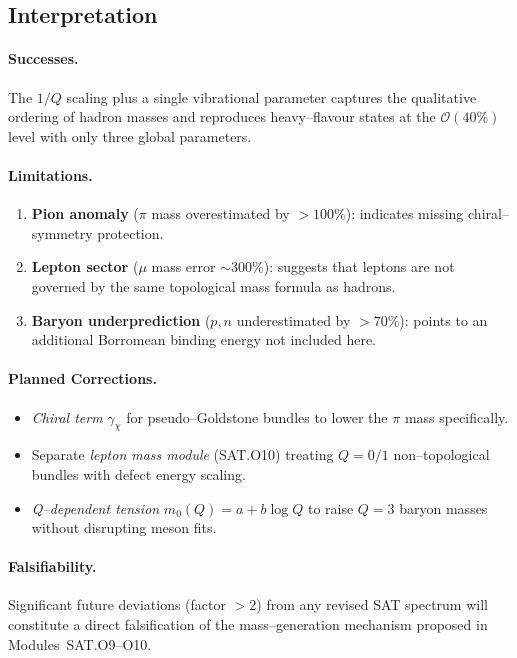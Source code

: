 \subsection{Interpretation}

\paragraph{Successes.}  The $1/Q$ scaling plus a single vibrational parameter
captures the qualitative ordering of hadron masses and reproduces heavy--flavour
states at the $\mathcal{O}(40\%)$ level with only three global parameters.

\paragraph{Limitations.}
\begin{enumerate}
    \item \textbf{Pion anomaly} ($\pi$ mass overestimated by $>100\%$):
          indicates missing chiral--symmetry protection.
    \item \textbf{Lepton sector} ($\mu$ mass error $\sim300\%$):
          suggests that leptons are not governed by the same
          topological mass formula as hadrons.
    \item \textbf{Baryon underprediction} ($p,n$ underestimated by $>70\%$):
          points to an additional Borromean binding energy not included here.
\end{enumerate}

\paragraph{Planned Corrections.}
\begin{itemize}
    \item \emph{Chiral term} $\gamma_\chi$ for pseudo--Goldstone bundles to
          lower the $\pi$ mass specifically.
    \item Separate \emph{lepton mass module} (SAT.O10) treating $Q=0/1$
          non--topological bundles with defect energy scaling.
    \item \emph{Q--dependent tension} $m_0(Q) = a + b\log Q$ to raise
          $Q=3$ baryon masses without disrupting meson fits.
\end{itemize}

\paragraph{Falsifiability.}
Significant future deviations (factor $>2$) from any revised SAT spectrum will
constitute a direct falsification of the mass--generation mechanism proposed
in Modules~SAT.O9--O10.


